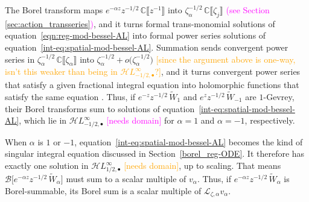 \documentclass{article}
\newcommand{\singexp}[2]{\mathcal{H}L^\infty_{#1, #2}}
\newcommand{\singexpalg}[1]{\singexp{#1}{\bullet}}
\newcommand{\C}{\mathbb{C}}
\newcommand{\laplace}{\mathcal{L}}
\newcommand{\borel}{\mathcal{B}}
\theoremstyle{definition}
\theoremstyle{plain}
\begin{document}
The Borel transform maps $e^{-\alpha z} z^{-1/2}\,\C\llbracket z^{-1} \rrbracket$ into $\zeta_\alpha^{-1/2}\,\C\llbracket \zeta_j \rrbracket$ \textcolor{magenta}{(see Section \ref{sec:action_transseries})}, and it turns formal trans-monomial solutions of equation~\eqref{eqn:reg-mod-bessel-AL} into formal power series solutions of equation~\eqref{int-eq:spatial-mod-bessel-AL}. Summation sends convergent power series in $\zeta_\alpha^{-1/2}\,\C\llbracket \zeta_\alpha \rrbracket$ into $\zeta_\alpha^{-1/2}+ o\big(\zeta_\alpha^{-1/2}\big)$ \textcolor{orange}{[since the argument above is one-way, isn't this weaker than being in $\singexpalg{-1/2}$?]}, and it turns convergent power series that satisfy a given fractional integral equation into holomorphic functions that satisfy the same equation \cite[Lemma 2]{reg-sing-volterra}. Thus, if $e^{-z} z^{-1/2}\,\tilde{W}_1$ and $e^z z^{-1/2}\,\tilde{W}_{-1}$ are $1$-Gevrey, their Borel transforms sum to solutions of equation~\eqref{int-eq:spatial-mod-bessel-AL}, which lie in $\singexpalg{-1/2}$ \textcolor{magenta}{[needs domain]} for $\alpha = 1$ and $\alpha = -1$, respectively.

When $\alpha$ is $1$ or $-1$, equation~\eqref{int-eq:spatial-mod-bessel-AL} becomes the kind of singular integral equation discussed in Section~\ref{borel_reg-ODE}. It therefore has exactly one solution in $\singexpalg{1/2}$ \textcolor{orange}{[needs domain]}, up to scaling. That means $\borel\big[ e^{-\alpha z} z^{-1/2}\,\tilde{W}_\alpha \big]$ must sum to a scalar multiple of $v_\alpha$. Thus, if $e^{-\alpha z} z^{-1/2}\,\tilde{W}_\alpha$ is Borel-summable, its Borel sum is a scalar multiple of $\laplace_{\zeta, \alpha} v_\alpha$.
\end{document}
